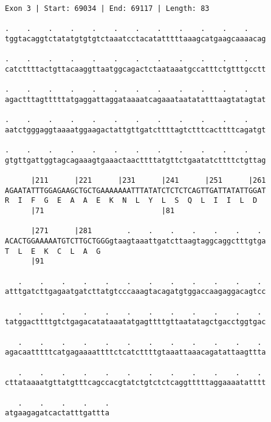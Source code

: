 \documentclass{article}
\begin{document}
\begin{Verbatim}[fontfamily=courier]
Exon 3 | Start: 69034 | End: 69117 | Length: 83

.    .    .    .    .    .    .    .    .    .    .    .    
tggtacaggtctatatgtgtgtctaaatcctacatatttttaaagcatgaagcaaaacag

.    .    .    .    .    .    .    .    .    .    .    .    
catcttttactgttacaaggttaatggcagactctaataaatgccatttctgtttgcctt

.    .    .    .    .    .    .    .    .    .    .    .    
agactttagtttttatgaggattaggataaaatcagaaataatatatttaagtatagtat

.    .    .    .    .    .    .    .    .    .    .    .    
aatctgggaggtaaaatggaagactattgttgatcttttagtctttcacttttcagatgt

.    .    .    .    .    .    .    .    .    .    .    .    
gtgttgattggtagcagaaagtgaaactaacttttatgttctgaatatcttttctgttag

      |211      |221      |231      |241      |251      |261
AGAATATTTGGAGAAGCTGCTGAAAAAAATTTATATCTCTCTCAGTTGATTATATTGGAT
R  I  F  G  E  A  A  E  K  N  L  Y  L  S  Q  L  I  I  L  D  
      |71                           |81                     

      |271      |281        .    .    .    .    .    .    . 
ACACTGGAAAAATGTCTTGCTGGGgtaagtaaattgatcttaagtaggcaggctttgtga
T  L  E  K  C  L  A  G                                      
      |91                                                   

   .    .    .    .    .    .    .    .    .    .    .    . 
atttgatcttgagaatgatcttatgtcccaaagtacagatgtggaccaagaggacagtcc

   .    .    .    .    .    .    .    .    .    .    .    . 
tatggacttttgtctgagacatataaatatgagttttgttaatatagctgacctggtgac

   .    .    .    .    .    .    .    .    .    .    .    . 
agacaatttttcatgagaaaattttctcatcttttgtaaattaaacagatattaagttta

   .    .    .    .    .    .    .    .    .    .    .    . 
cttataaaatgttatgtttcagccacgtatctgtctctcaggtttttaggaaaatatttt

   .    .    .    .    .
atgaagagatcactatttgattta
\end{Verbatim}
\newpage
\end{document}
